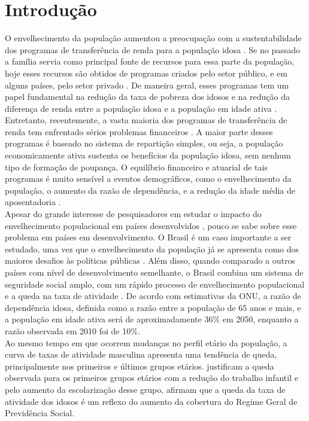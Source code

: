 \documentclass[12pt, 						%
			openright, 					%
			twoside,					%
			a4paper,x					%
			english,					%
			brazil]{abntex2}				%
\begin{document}
\chapter{Introdução \label{cap1}}
	O envelhecimento da população aumentou a preocupação com a sustentabilidade dos programas de transferência de renda para a população idosa \cite{cutler1990aging, bloom2003demographic, bloom2004global, lee2002fiscal, lee2003intergenerational, lee1994formal}. Se no passado a família servia como principal fonte de recursos para essa parte da população, hoje esses recursos são obtidos de programas criados pelo setor público, e em alguns países, pelo setor privado \cite{costa1998evolution}. De maneira geral, esses programas tem um papel fundamental na redução da taxa de pobreza dos idosos e na redução da diferença de renda entre a população idosa e a população em idade ativa \cite{gruber2001international}. Entretanto, recentemente, a vasta maioria dos programas de transferência de renda tem enfrentado sérios problemas financeiros \cite{bongaarts2004population, bloom}. A maior parte desses programas é baseado no sistema de repartição simples, ou seja, a população economicamente ativa sustenta os benefícios da população idosa, sem nenhum tipo de formação de poupança. O equilíbrio  financeiro e atuarial de tais programas é  muito sensível a eventos demográficos, como o envelhecimento da população, o aumento da razão de dependência, e a redução da idade média de aposentadoria \cite{bongaarts2004population, bloom, turra2011}. \\
	Apesar do grande interesse de pesquisadores em estudar o impacto do envelhecimento populacional em países desenvolvidos \cite{gruber2005social,gruber2008social,wise2004social}, pouco se sabe sobre esse problema em países em desenvolvimento. O Brasil é um caso importante a ser estudado, uma vez que o envelhecimento da população já se apresenta como dos maiores desafios às políticas públicas \cite{turra2005before, turra2011}. Além disso, quando comparado a outros países com nível de desenvolvimento semelhante, o Brasil combina um sistema de seguridade social amplo, com um rápido processo de envelhecimento populacional e a queda na taxa de atividade \cite{turra2011}. De acordo com estimativas da ONU, a razão de dependência idosa, definida como a razão entre a população de 65 anos e mais, e a população em idade ativa será de aproximadamente 36\% em 2050, enquanto a razão observada em 2010 foi de 10\%. \\
	Ao mesmo tempo em que ocorrem mudanças no perfil etário da população, a curva de taxas de atividade masculina apresenta uma tendência de queda, principalmente nos primeiros e últimos grupos etários.  justificam a queda observada para os primeiros grupos etários com a redução do trabalho infantil e pelo aumento da escolarização desse grupo,  afirmam que a queda da taxa de atividade dos idosos é um reflexo do aumento da cobertura do Regime Geral de Previdência Social.\\
\end{document}
